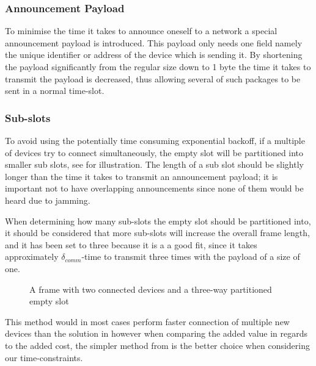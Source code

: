 \subsubsection*{Announcement Payload}\label{apay} %
\label{ssub:announcements}
To minimise the time it takes to announce oneself to a network a special announcement payload is introduced.
This payload only needs one field namely the unique identifier or address of the device which is sending it.
By shortening the payload significantly from the regular size down to 1 byte the time it takes to transmit the payload is decreased, thus allowing several of such packages to be sent in a normal time-slot.

\subsubsection{Sub-slots} %
\label{ssub:sub_slots}
To avoid using the potentially time consuming exponential backoff, if a multiple of devices try to connect simultaneously, the empty slot will be partitioned into smaller sub slots, see  for illustration. 
The length of a sub slot should be slightly longer than the time it takes to transmit an announcement payload; it is important not to have overlapping announcements since none of them would be heard due to jamming.

When determining how many sub-slots the empty slot should be partitioned into, it should be considered that more sub-slots will increase the overall frame length, and it has been set to three because it is a a good fit, since it takes approximately $\delta_{comm}$-time to transmit three times with the payload of a size of one.

\begin{figure}[h]
    \centering \footnotesize
    
    \caption{A frame with two connected devices and a three-way partitioned empty slot}
    \label{fig:frame_wsubslots}
\end{figure}

\noindent
This method would in most cases perform faster connection of multiple new devices than the solution in  however when comparing the added value in regards to the added cost, the simpler method from  is the better choice when considering our time-constraints.